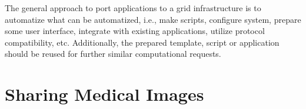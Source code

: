 The general approach to port applications to a grid infrastructure is to automatize what can be automatized, i.e., make scripts, configure system, prepare some user interface, integrate with existing applications, utilize protocol compatibility, etc. Additionally, the prepared template, script or application should be reused for further similar computational requests.

\section{Sharing Medical Images}
\label{sec:imaging}







